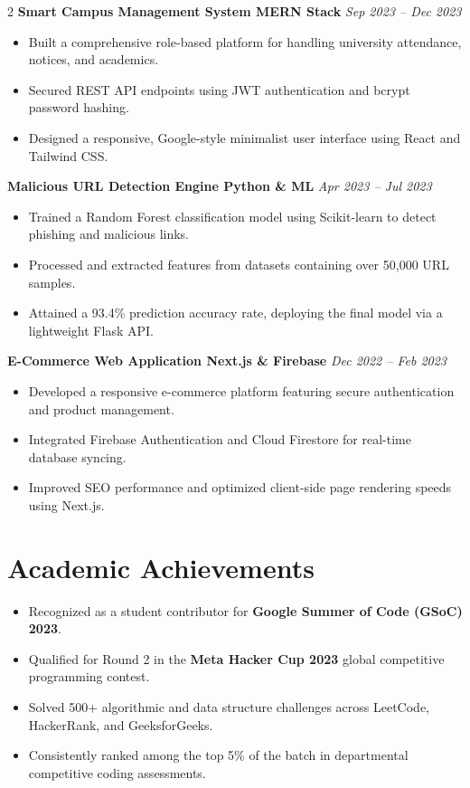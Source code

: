 \documentclass[10pt,a4paper]{article}
\begin{document}
\begin{paracol}{2}
\vspace{4pt}
\textbf{Smart Campus Management System \textbar{} MERN Stack} \hfill \textit{Sep 2023 -- Dec 2023}
\begin{itemize}
\item Built a comprehensive role-based platform for handling university attendance, notices, and academics.
\item Secured REST API endpoints using JWT authentication and bcrypt password hashing.
\item Designed a responsive, Google-style minimalist user interface using React and Tailwind CSS.
\end{itemize}

\vspace{4pt}
\textbf{Malicious URL Detection Engine \textbar{} Python \& ML} \hfill \textit{Apr 2023 -- Jul 2023}
\begin{itemize}
\item Trained a Random Forest classification model using Scikit-learn to detect phishing and malicious links.
\item Processed and extracted features from datasets containing over 50,000 URL samples.
\item Attained a 93.4\% prediction accuracy rate, deploying the final model via a lightweight Flask API.
\end{itemize}

\vspace{4pt}
\textbf{E-Commerce Web Application \textbar{} Next.js \& Firebase} \hfill \textit{Dec 2022 -- Feb 2023}
\begin{itemize}
\item Developed a responsive e-commerce platform featuring secure authentication and product management.
\item Integrated Firebase Authentication and Cloud Firestore for real-time database syncing.
\item Improved SEO performance and optimized client-side page rendering speeds using Next.js.
\end{itemize}

\section*{Academic Achievements}
\begin{itemize}
\item Recognized as a student contributor for \textbf{Google Summer of Code (GSoC) 2023}.
\item Qualified for Round 2 in the \textbf{Meta Hacker Cup 2023} global competitive programming contest.
\item Solved 500+ algorithmic and data structure challenges across LeetCode, HackerRank, and GeeksforGeeks.
\item Consistently ranked among the top 5\% of the batch in departmental competitive coding assessments.
\end{itemize}


\end{paracol}
\end{document}
